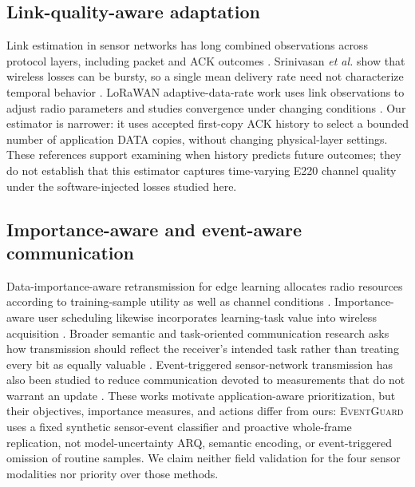 \documentclass[11pt]{article}
\newcommand{\EG}{\textsc{EventGuard}}
\begin{document}
\subsection{Link-quality-aware adaptation}\label{sec:link-quality-aware-adaptation}

Link estimation in sensor networks has long combined observations across protocol layers, including packet and ACK outcomes \cite{fonseca2007fourbit}. Srinivasan \emph{et al.} show that wireless losses can be bursty, so a single mean delivery rate need not characterize temporal behavior \cite{srinivasan2008beta}. LoRaWAN adaptive-data-rate work uses link observations to adjust radio parameters and studies convergence under changing conditions \cite{finnegan2020adr}. Our estimator is narrower: it uses accepted first-copy ACK history to select a bounded number of application DATA copies, without changing physical-layer settings. These references support examining when history predicts future outcomes; they do not establish that this estimator captures time-varying E220 channel quality under the software-injected losses studied here.

\subsection{Importance-aware and event-aware communication}\label{sec:importance-aware-and-event-aware-communication}

Data-importance-aware retransmission for edge learning allocates radio resources according to training-sample utility as well as channel conditions \cite{liu2021dataimportance}. Importance-aware user scheduling likewise incorporates learning-task value into wireless acquisition \cite{liu2021scheduling}. Broader semantic and task-oriented communication research asks how transmission should reflect the receiver's intended task rather than treating every bit as equally valuable \cite{lan2021semantic}. Event-triggered sensor-network transmission has also been studied to reduce communication devoted to measurements that do not warrant an update \cite{ge2019eventtriggered}. These works motivate application-aware prioritization, but their objectives, importance measures, and actions differ from ours: \EG{} uses a fixed synthetic sensor-event classifier and proactive whole-frame replication, not model-uncertainty ARQ, semantic encoding, or event-triggered omission of routine samples. We claim neither field validation for the four sensor modalities nor priority over those methods.
\end{document}
